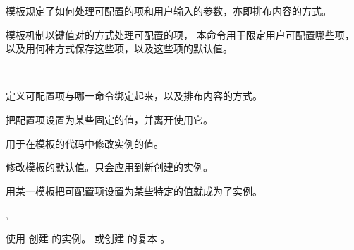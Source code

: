 \documentclass[twoside]{book}
\begin{document}
模板规定了如何处理可配置的项和用户输入的参数，亦即排布内容的方式。
\begin{function}[module=lttemplates]{\DeclareTemplateInterface}
  \begin{syntax}
    \V\DeclareTemplateInterface {}   
  \end{syntax}
\LaTeXe 模板机制以键值对的方式处理可配置的项，
本命令用于限定用户可配置哪些项，以及用何种方式保存这些项，以及这些项的默认值。
\end{function}

\begin{function}[module=lttemplates]{\DeclareTemplateCode}
  \begin{syntax}
    \V\DeclareTemplateCode {}  
    ~~ 
  \end{syntax}
定义可配置项与哪一命令绑定起来，以及排布内容的方式。
\end{function}

\begin{function}[module=lttemplates]{\UseTemplate}
  \begin{syntax}
    \V\UseInstance {}   
  \end{syntax}
把配置项设置为某些固定的值，并离开使用它。
\end{function}

\begin{function}[module=lttemplates]{\SetTemplateKeys}
  \begin{syntax}
    \V\SetTemplateKeys {}  
  \end{syntax}
用于在模板的代码中修改实例的值。
\end{function}

\begin{function}[module=lttemplates]{\EditTemplateDefaults}
  \begin{syntax}
    \V\EditTemplateDefaults {}  
  \end{syntax}
修改模板的默认值。只会应用到新创建的实例。
\end{function}

用某一模板把可配置项设置为某些特定的值就成为了实例。
\begin{function}[module=lttemplates]{\DeclareInstance,\DeclareInstanceCopy}
  \begin{syntax}
    \V\DeclareInstance {}   
    \V\DeclareInstanceCopy {}  
  \end{syntax}
使用  创建  的实例。
或创建  的复本 。
\end{function}
\end{document}
